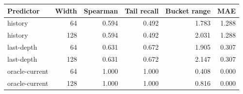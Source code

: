 \begin{tabular}{lrrrrr}
\toprule
Predictor & Width & Spearman & Tail recall & Bucket range & MAE \\
\midrule
history & 64 & 0.594 & 0.492 & 1.783 & 1.288 \\
history & 128 & 0.594 & 0.492 & 2.031 & 1.288 \\
last-depth & 64 & 0.631 & 0.672 & 1.905 & 0.307 \\
last-depth & 128 & 0.631 & 0.672 & 2.147 & 0.307 \\
oracle-current & 64 & 1.000 & 1.000 & 0.408 & 0.000 \\
oracle-current & 128 & 1.000 & 1.000 & 0.816 & 0.000 \\
\bottomrule
\end{tabular}
